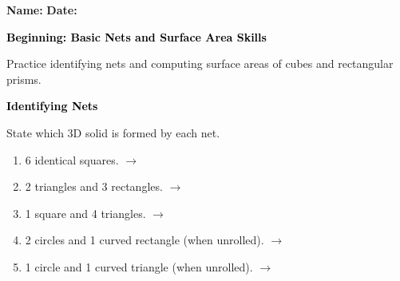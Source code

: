 \documentclass[12pt, letterpaper, fleqn]{article}
\newcommand{\blank}{\underline{\hspace{2.2cm}}}
\begin{document}
\textbf{Name:} \underline{\hspace{5cm}}
\hfill
\textbf{Date:} \underline{\hspace{3cm}}\\

\begin{tcolorbox}[colback=black!10]
    \large\textcolor{black}{\textbf{Beginning: Basic Nets and Surface Area Skills}}
\end{tcolorbox}

\vspace{3mm}

\noindent
Practice identifying nets and computing surface areas of cubes and rectangular prisms.

\vspace{4mm}

\begin{tcolorbox}[colback=black!10]
\large\textcolor{black}{\textbf{Identifying Nets}}
\end{tcolorbox}

\noindent
State which 3D solid is formed by each net.

\vspace{3mm}

\begin{enumerate}[itemsep=1cm, leftmargin=0.6cm]

\item 6 identical squares. \quad $\rightarrow$ \quad \blank

\vspace{1.2cm}

\item 2 triangles and 3 rectangles. \quad $\rightarrow$ \quad \blank

\vspace{1.2cm}

\item 1 square and 4 triangles. \quad $\rightarrow$ \quad \blank

\vspace{1.2cm}

\item 2 circles and 1 curved rectangle (when unrolled). \quad $\rightarrow$ \quad \blank

\vspace{1.2cm}

\item 1 circle and 1 curved triangle (when unrolled). \quad $\rightarrow$ \quad \blank
\vspace{1.2cm}


\end{enumerate}
\end{document}
